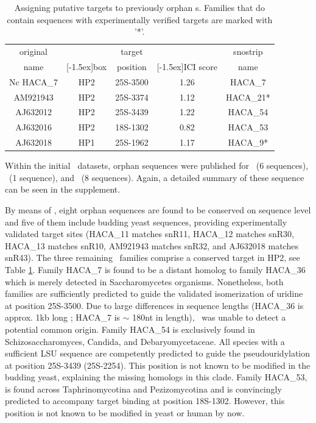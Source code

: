 \begin{table}
  \caption[Potential targets for orphan \haca s.]{Assigning putative targets to previously
    orphan \haca s. Families that do contain sequences with
    experimentally verified targets are marked with '*'. }
  \label{tab:orphan_hacas_short}
  \begin{center}
    \begin{footnotesize}
      \begin{tabular}{c|c|c|c|c}
        original&&target&&snostrip\\
        name&\raisebox{1.5ex}[-1.5ex]{box}&position&\raisebox{1.5ex}[-1.5ex]{ICI
            score}&name\\
        \hline
        Nc HACA\_7&HP2&25S-3500&1.26&HACA\_7\\
        AM921943&HP2&25S-3374&1.12&HACA\_21*\\
        AJ632012&HP2&25S-3439&1.22&HACA\_54\\
        AJ632016&HP2&18S-1302&0.82&HACA\_53\\
        AJ632018&HP1&25S-1962&1.17&HACA\_9*\\
      \end{tabular}
    \end{footnotesize}
  \end{center}
\end{table}

Within the initial \haca\ datasets, orphan sequences were
published for \ncr\ (6 sequences), \afu\ (1 sequence), and \spo\ (8
sequences). Again, a detailed summary of these sequence can be seen in the supplement.

By means of \snostrip, eight orphan sequences are found to be conserved on sequence level and five of them include budding yeast sequences, providing experimentally validated target sites (HACA\_11 matches
snR11, HACA\_12 matches snR30, HACA\_13 matches snR10, AM921943
matches snR32, and AJ632018 matches snR43). The three remaining \sno\
families comprise a 
conserved target in HP2, see Table \ref{tab:orphan_hacas_short}. Family HACA\_7 is found to be a distant
homolog to family HACA\_36 which is merely detected in Saccharomycetes
organisms. Nonetheless, both families are sufficiently predicted to
guide the validated isomerization of uridine at position
25S-3500. Due to large differences in sequence lengths (HACA\_36 is approx. 1kb long
; HACA\_7 is $\sim$ 180nt in length), \snostrip\ was unable to detect a
potential common origin. Family HACA\_54 is exclusively found in Schizosaccharomyces,
Candida, and Debaryomycetaceae. All species with a sufficient LSU sequence
are competently predicted to guide the pseudouridylation at position
25S-3439 (\sce 25S-2254). This position is not known to be modified
in the budding yeast, 
explaining the missing homologs in this clade. Family HACA\_53, is
found across Taphrinomycotina and Pezizomycotina and is convincingly
predicted to accompany target binding at position 18S-1302. However, this position is not known to be modified in yeast or human by now.

